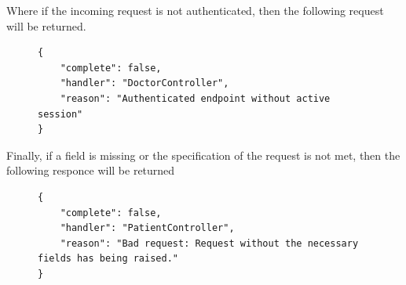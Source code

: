 					Where if the incoming request is not authenticated, then the following request will be returned.
					\begin{figure}[H]
						\iftrue
						\begin{lstlisting}[]
{
	"complete": false,
	"handler": "DoctorController",
	"reason": "Authenticated endpoint without active session"
}
						\end{lstlisting}
					\end{figure}
					Finally, if a field is missing or the specification of the request is not met, then the following responce will be returned
					\begin{figure}[H]
						\iftrue
						\begin{lstlisting}[]
{
	"complete": false,
	"handler": "PatientController",
	"reason": "Bad request: Request without the necessary fields has being raised."
}					
						\end{lstlisting}
					\end{figure}
